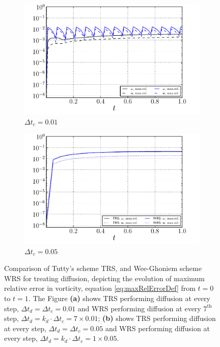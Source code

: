 \begin{figure}[!h]
  \centering
  \begin{subfigure}[b]{0.45\textwidth}
          \includegraphics[width=\textwidth]{figures/lagrangian/lambOseen_errorEvolution_WRSvsTRS_dt0p01.pdf}
          \caption{$\Delta t_c = 0.01$}
          \label{fig:lambOseen_errorEvolution_WRSvsTRS_dt0p01}
  \end{subfigure}%
  \qquad %
  \begin{subfigure}[b]{0.45\textwidth}
          \includegraphics[width=\textwidth]{figures/lagrangian/lambOseen_errorEvolution_WRSvsTRS_dt0p05.pdf}
          \caption{$\Delta t_c = 0.05$}
          \label{fig:lambOseen_errorEvolution_WRSvsTRS_dt0p05}
  \end{subfigure}
  
  \caption{Comparison of Tutty's scheme TRS, and Wee-Ghoniem scheme WRS for treating diffusion, depicting the evolution of maximum relative error in vorticity, equation \ref{eq:maxRelErrorDef} from $t=0$ to $t=1$. The Figure \textbf{(a)} shows TRS performing diffusion at every step, $\Delta t_d=\Delta t_c = 0.01$ and WRS performing diffusion at every $7^{\mathrm{th}}$ step, $\Delta t_d = k_d\cdot\Delta t_c = 7\times0.01$; \textbf{(b)} shows TRS performing diffusion at every step, $\Delta t_d=\Delta t_c = 0.05$ and WRS performing diffusion at every step, $\Delta t_d = k_d\cdot\Delta t_c = 1\times0.05$.}
  \label{fig:lambOseen_diffusionMethod_comparison}
 \end{figure}

